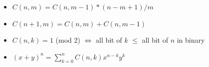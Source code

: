\begin{itemize}
	\item $C(n, m) = C(n, m - 1) * (n - m + 1) / m$
	\item $C(n + 1, m) = C(n, m) + C(n, m - 1)$
	\item $C(n, k) = 1$ (mod 2) $\Leftrightarrow$ all bit of $k$ $\leq$ all bit of $n$ in binary
	\item $(x+y)^n = \sum_{k=0}^{n} C(n,k) x^{n-k} y^k$
\end{itemize}